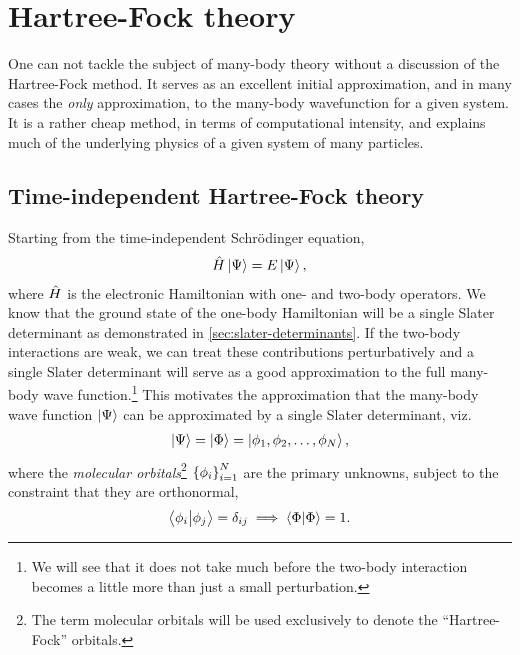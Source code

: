 \chapter{Hartree-Fock theory}
    \label{chap:hf}
    One can not tackle the subject of many-body theory without a discussion of
    the Hartree-Fock method. It serves as an excellent initial approximation,
    and in many cases the \emph{only} approximation, to the many-body
    wavefunction for a given system. It is a rather cheap method, in terms of
    computational intensity, and explains much of the underlying physics of a
    given system of many particles.

    \section{Time-independent Hartree-Fock theory}
        Starting from the time-independent Schrödinger equation,
        \begin{align}
            \hat{H}\ket{\Psi} = E\ket{\Psi},
        \end{align}
        where $\hat{H}$ is the electronic Hamiltonian with one- and two-body
        operators.
        We know that the ground state of the one-body Hamiltonian will be a
        single Slater determinant as demonstrated in
        \autoref{sec:slater-determinants}.
        If the two-body interactions are weak, we can treat these contributions
        perturbatively and a single Slater determinant will serve as a good
        approximation to the full many-body wave function.\footnote{%
            We will see that it does not take much before the two-body
            interaction becomes a little more than just a small perturbation.
        }
        This motivates the approximation that the many-body wave function
        $\ket{\Psi}$ can be approximated by a single Slater determinant, viz.
        \begin{align}
            \ket{\Psi} = \ket{\Phi} = \ket{\phi_1, \phi_2, \dots, \phi_N},
        \end{align}
        where the \emph{molecular orbitals}\footnote{%
            The term molecular orbitals will be used exclusively to denote the
            ``Hartree-Fock'' orbitals.
        } $\left\{ \phi_i \right\}_{i = 1}^{N}$ are the
        primary unknowns, subject to the constraint that they are orthonormal,
        \begin{align}
            \braket{\phi_i}{\phi_j} = \delta_{ij}
            \implies
            \braket{\Phi} = 1.
        \end{align}

